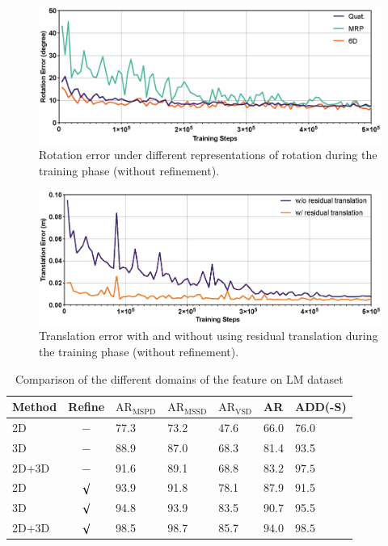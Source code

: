 \documentclass[12pt,DIV14,BCOR12mm,a4paper,footinclude=false,headinclude,parskip=half-,twoside,openright,cleardoublepage=empty,toc=index,bibliography=totoc,listof=totoc]{scrreprt}
\numberwithin{equation}{chapter}
\begin{document}
\begin{figure}[H]
	\centering
	\includegraphics[width=1.\textwidth]{img/ab_rot.eps}
	\caption{Rotation error under different representations of rotation during the training phase (without refinement).}
	\label{img:ab_rot}
\end{figure}

\begin{figure}[H]
	\centering
	\includegraphics[width=1.\textwidth]{img/ab_trans.eps}
	\caption{Translation error with and without using residual translation during the training phase (without refinement).}
	\label{img:ab_trans}
\end{figure}

\begin{table}[H]
  \centering
  \caption{Comparison of the different domains of the feature on LM dataset}
  \label{tab:ab_feat_lm}
  \begin{tabular}{l | c | C{16mm} C{16mm} C{16mm}| C{16mm}| C{16mm}}
      \toprule
      Method & Refine & $\text{AR}_{\text{MSPD}}$ & $\text{AR}_{\text{MSSD}}$ & $\text{AR}_{\text{VSD}}$ & AR & ADD(-S) \\
      \midrule
      2D  & $-$ & 77.3 & 73.2 & 47.6 & 66.0 & 76.0 \\
      3D & $-$ & 88.9 & 87.0 & 68.3 & 81.4 & 93.5 \\
      2D+3D  & $-$ & 91.6 & 89.1 & 68.8 & $\mathbf{83.2}$ & $\mathbf{97.5}$ \\
      2D  & $\surd$ & 93.9 & 91.8 & 78.1 & 87.9 & 91.5 \\
      3D & $\surd$ & 94.8 & 93.9 & 83.5 & 90.7 & 95.5 \\
      2D+3D  & $\surd$ & 98.5 & 98.7 & 85.7 & $\mathbf{94.0}$ & $\mathbf{98.5}$ \\
      \bottomrule
  \end{tabular}
\end{table}
\end{document}
